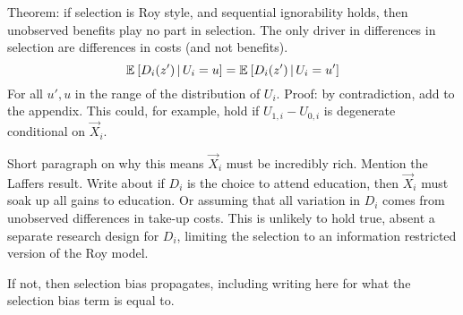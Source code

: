 Theorem: if selection is Roy style, and sequential ignorability holds, then unobserved benefits play no part in selection.
The only driver in differences in selection are differences in costs (and not benefits).
\[ \mathbb{E}_{} \left[  D_i(z')  \, \middle\vert \,  U_i = u \right] = \mathbb{E}_{} \left[  D_i(z')  \, \middle\vert \,  U_i = u' \right] \]
For all $u', u$ in the range of the distribution of $U_i$.
Proof: by contradiction, add to the appendix.
This could, for example, hold if $U_{1,i} - U_{0,i}$ is degenerate conditional on $\vec X_i$.

Short paragraph on why this means $\vec X_i$ must be incredibly rich.
Mention the Laffers result.
Write about if $D_i$ is the choice to attend education, then $\vec X_i$ must soak up all gains to education.
Or assuming that all variation in $D_i$ comes from unobserved differences in take-up costs.
This is unlikely to hold true, absent a separate research design for $D_i$, limiting the selection to an information restricted version of the Roy model.

If not, then selection bias propagates, including writing here for what the selection bias term is equal to.

% 
% 
% 
% 
